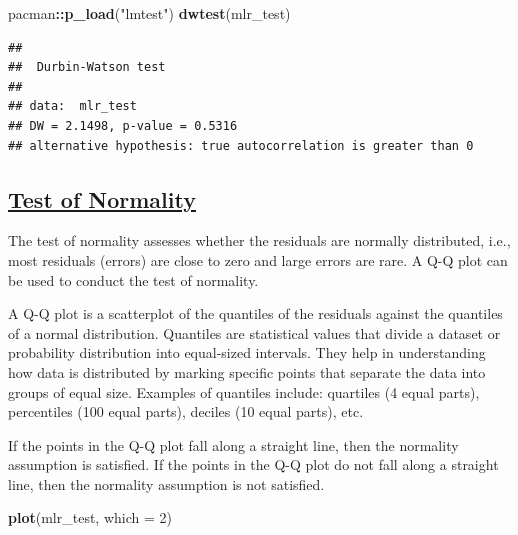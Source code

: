 \documentclass[
]{article}
\newenvironment{Shaded}{\begin{snugshade}}{\end{snugshade}}
\newcommand{\AttributeTok}[1]{\textcolor[rgb]{0.13,0.29,0.53}{#1}}
\newcommand{\DecValTok}[1]{\textcolor[rgb]{0.00,0.00,0.81}{#1}}
\newcommand{\FunctionTok}[1]{\textcolor[rgb]{0.13,0.29,0.53}{\textbf{#1}}}
\newcommand{\NormalTok}[1]{#1}
\newcommand{\SpecialCharTok}[1]{\textcolor[rgb]{0.81,0.36,0.00}{\textbf{#1}}}
\newcommand{\StringTok}[1]{\textcolor[rgb]{0.31,0.60,0.02}{#1}}
\begin{document}
\begin{Shaded}
\begin{Highlighting}[]
\NormalTok{pacman}\SpecialCharTok{::}\FunctionTok{p\_load}\NormalTok{(}\StringTok{"lmtest"}\NormalTok{)}
\FunctionTok{dwtest}\NormalTok{(mlr\_test)}
\end{Highlighting}
\end{Shaded}

\begin{verbatim}
## 
##  Durbin-Watson test
## 
## data:  mlr_test
## DW = 2.1498, p-value = 0.5316
## alternative hypothesis: true autocorrelation is greater than 0
\end{verbatim}

\subsection{\texorpdfstring{\ul{\textbf{Test of
Normality}}}{Test of Normality}}\label{test-of-normality}

The test of normality assesses whether the residuals are normally
distributed, i.e., most residuals (errors) are close to zero and large
errors are rare. A Q-Q plot can be used to conduct the test of
normality.

A Q-Q plot is a scatterplot of the quantiles of the residuals against
the quantiles of a normal distribution. Quantiles are statistical values
that divide a dataset or probability distribution into equal-sized
intervals. They help in understanding how data is distributed by marking
specific points that separate the data into groups of equal size.
Examples of quantiles include: quartiles (4 equal parts), percentiles
(100 equal parts), deciles (10 equal parts), etc.

If the points in the Q-Q plot fall along a straight line, then the
normality assumption is satisfied. If the points in the Q-Q plot do not
fall along a straight line, then the normality assumption is not
satisfied.

\begin{Shaded}
\begin{Highlighting}[]
\FunctionTok{plot}\NormalTok{(mlr\_test, }\AttributeTok{which =} \DecValTok{2}\NormalTok{)}
\end{Highlighting}
\end{Shaded}
\end{document}
